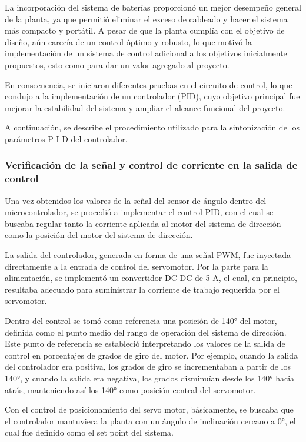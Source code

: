 \documentclass[12pt,letterpaper]{report}
\begin{document}
La incorporación del sistema de baterías proporcionó un mejor desempeño general de la planta, ya que permitió eliminar el exceso de cableado y hacer el sistema más compacto y portátil. A pesar de que la planta cumplía con el objetivo de diseño, aún carecía de un control óptimo y robusto, lo que motivó la implementación de un sistema de control adicional a los objetivos inicialmente propuestos, esto como para dar un valor agregado al proyecto.

En consecuencia, se iniciaron diferentes pruebas en el circuito de control, lo que condujo a la implementación de un controlador (PID), cuyo objetivo principal fue mejorar la estabilidad del sistema y ampliar el alcance funcional del proyecto.


A continuación, se describe el procedimiento utilizado para la sintonización de los parámetros P I D del controlador.

\subsubsection*{Verificación de la señal y control de corriente en la salida de control}

Una vez obtenidos los valores de la señal del sensor de ángulo dentro del microcontrolador, se procedió a implementar el control PID, con el cual se buscaba regular tanto la corriente aplicada al motor del sistema de dirección como la posición del motor del sistema de dirección.

La salida del controlador, generada en forma de una señal PWM, fue inyectada directamente a la entrada de control del servomotor. Por la parte para la alimentación, se implementó un convertidor DC-DC de 5 A, el cual, en principio, resultaba adecuado para suministrar la corriente de trabajo requerida por el servomotor.

Dentro del control se tomó como referencia una posición de 140° del motor, definida como el punto medio del rango de operación del sistema de dirección. Este punto de referencia se estableció interpretando los valores de la salida de control en porcentajes de grados de giro del motor. Por ejemplo, cuando la salida del controlador era positiva, los grados de giro se incrementaban a partir de los 140°, y cuando la salida era negativa, los grados disminuían desde los 140° hacia atrás, manteniendo así los 140° como posición central del servomotor.

Con el control de posicionamiento del servo motor, básicamente, se buscaba que el controlador mantuviera la planta con un ángulo de inclinación cercano a 0°, el cual fue definido como el set point del sistema.
\end{document}
